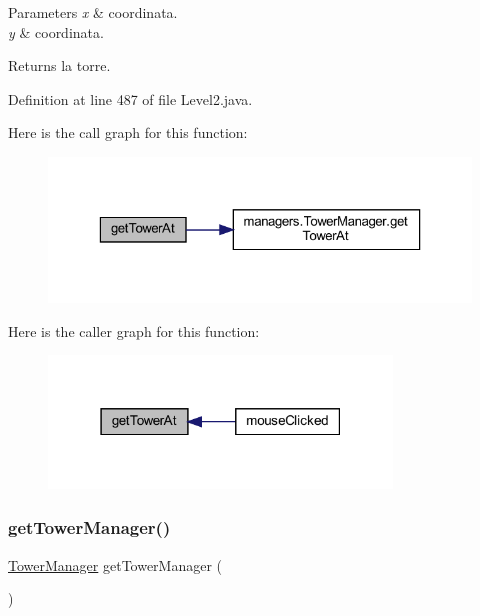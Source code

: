 \begin{DoxyParams}{Parameters}
{\em x} & coordinata. \\
\hline
{\em y} & coordinata.\\
\hline
\end{DoxyParams}
\begin{DoxyReturn}{Returns}
la torre. 
\end{DoxyReturn}


Definition at line 487 of file Level2.\+java.

Here is the call graph for this function\+:
\nopagebreak
\begin{figure}[H]
\begin{center}
\leavevmode
\includegraphics[width=323pt]{classscenes_1_1_level2_a4345f2e80059788e5ab1dd1cf0ff2c04_cgraph}
\end{center}
\end{figure}
Here is the caller graph for this function\+:\nopagebreak
\begin{figure}[H]
\begin{center}
\leavevmode
\includegraphics[width=259pt]{classscenes_1_1_level2_a4345f2e80059788e5ab1dd1cf0ff2c04_icgraph}
\end{center}
\end{figure}
\mbox{\label{classscenes_1_1_level2_a6fff8a01141127e3c2897a077e5dee92}} 
\subsubsection{\texorpdfstring{get\+Tower\+Manager()}{getTowerManager()}}
{\footnotesize\ttfamily \hyperlink{classmanagers_1_1_tower_manager}{Tower\+Manager} get\+Tower\+Manager (\begin{DoxyParamCaption}{ }\end{DoxyParamCaption})}



